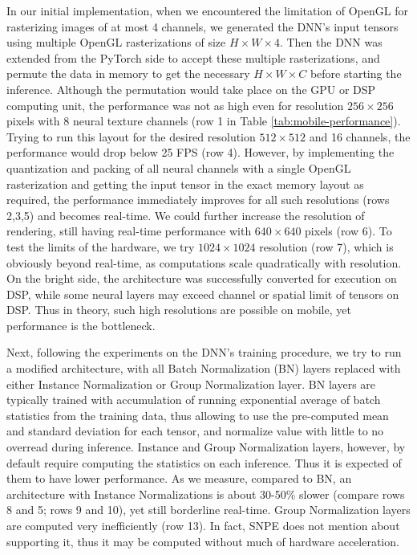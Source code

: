 In our initial implementation, when we encountered the limitation of OpenGL for rasterizing images of at most 4 channels, we generated the DNN's input tensors using multiple OpenGL rasterizations of size $H \times W \times 4$. Then the DNN was extended from the PyTorch side to accept these multiple rasterizations, and permute the data in memory to get the necessary $H \times W \times C$ before starting the inference. Although the permutation would take place on the GPU or DSP computing unit, the performance was not as high even for resolution $256 \times 256$ pixels with 8 neural texture channels (row 1 in Table \ref{tab:mobile-performance}). Trying to run this layout for the desired resolution $512 \times 512$ and 16 channels, the performance would drop below 25 FPS (row 4). However, by implementing the quantization and packing of all neural channels with a single OpenGL rasterization and getting the input tensor in the exact memory layout as required, the performance immediately improves for all such resolutions (rows 2,3,5) and becomes real-time. We could further increase the resolution of rendering, still having real-time performance with $640 \times 640$ pixels (row 6). To test the limits of the hardware, we try $1024 \times 1024$ resolution (row 7), which is obviously beyond real-time, as computations scale quadratically with resolution. On the bright side, the architecture was successfully converted for execution on DSP, while some neural layers may exceed channel or spatial limit of tensors on DSP. Thus in theory, such high resolutions are possible on mobile, yet performance is the bottleneck. 

Next, following the experiments on the DNN's training procedure, we try to run a modified architecture, with all Batch Normalization (BN) layers replaced with either Instance Normalization or Group Normalization layer. BN layers are typically trained with accumulation of running exponential average of batch statistics from the training data, thus allowing to use the pre-computed mean and standard deviation for each tensor, and normalize value with little to no overread during inference. Instance and Group Normalization layers, however, by default require computing the statistics on each inference. Thus it is expected of them to have lower performance. As we measure, compared to BN, an architecture with Instance Normalizations is about 30-50\% slower (compare rows 8 and 5; rows 9 and 10), yet still borderline real-time. Group Normalization layers are computed very inefficiently (row 13). In fact, SNPE does not mention about supporting it, thus it may be computed without much of hardware acceleration.

